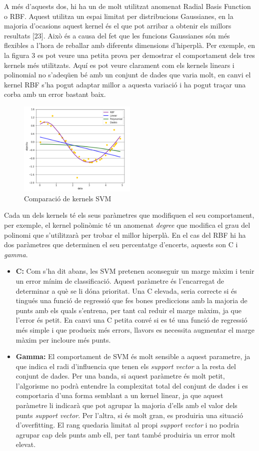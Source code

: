 \documentclass[10pt,a4paper,twocolumn,twoside]{article}
\begin{document}
A més d'aquests dos, hi ha un de molt utilitzat anomenat Radial Basis Function o RBF. Aquest utilitza un espai limitat per distribucions Gaussianes, en la majoria d'ocasions aquest kernel és el que pot arribar a obtenir els millors resultats [23]. Això és a causa del fet que les funcions Gaussianes són més flexibles a l'hora de reballar amb diferents dimensions d'hiperplà. Per exemple, en la figura 3 es pot veure una petita prova per demostrar el comportament dels tres kernels més utilitzats. Aquí es pot veure clarament com els kernels linears i polinomial no s'adeqüen bé amb un conjunt de dades que varia molt, en canvi el kernel RBF s'ha pogut adaptar millor a aquesta variació i ha pogut traçar una corba amb un error bastant baix.
\begin{figure}[!h]
\centering
	\includegraphics[width=0.5\textwidth]{../img/KernelsSVM}
	\caption{Comparació de kernels SVM}
	\label{fig-KernelsSVM}
\end{figure}

Cada un dels kernels té els seus paràmetres que modifiquen el seu comportament, per exemple, el kernel polinòmic té un anomenat \textit{degree} que modifica el grau del polinomi que s'utilitzarà per trobar el millor hiperplà. En el cas del RBF hi ha dos paràmetres que determinen el seu percentatge d'encerts, aquests son C i \textit{gamma}.
\begin{itemize}
\item \textbf{C:} Com s'ha dit abans, les SVM pretenen aconseguir un marge màxim i tenir un error mínim de classificació. Aquest paràmetre és l'encarregat de determinar a què se li dóna prioritat. Una C elevada, seria correcte si és tingués una funció de regressió que fes bones prediccions amb la majoria de punts amb els quals s'entrena, per tant cal reduir el marge màxim, ja que l'error és petit. En canvi una C petita convé si es té una funció de regressió més simple i que produeix més errors, llavors es necessita augmentar el marge màxim per incloure més punts.
\item \textbf{Gamma:} El comportament de SVM és molt sensible a aquest parametre, ja que indica el radi d'influencia que tenen els \textit{support vector} a la resta del conjunt de dades. Per una banda, si aquest paràmetre és molt petit, l'algorisme no podrà entendre la complexitat total del conjunt de dades i es comportaria d'una forma semblant a un kernel linear, ja que aquest paràmetre li indicarà que pot agrupar la majoria d'ells amb el valor dels punts \textit{support vector}. Per l'altra, si és molt gran, es produiria una situació d'overfitting. El rang quedaria limitat al propi \textit{support vector} i no podria agrupar cap dels punts amb ell, per tant també produiria un error molt elevat.
\end{itemize}
\end{document}
